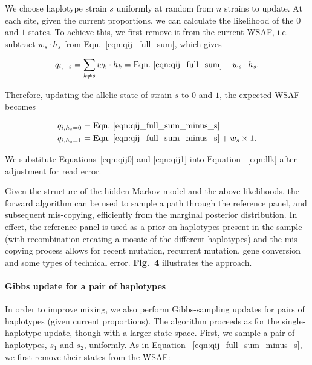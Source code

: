 \documentclass{nature}
\begin{document}
We choose haplotype strain $s$ uniformly at random from $n$ strains to update.  At each site, given the current proportions, we can calculate the likelihood of the $0$ and $1$ states.  To achieve this, we first remove it from the current WSAF, i.e. subtract $ w_s \cdot h_s$ from Eqn.~\eqref{eqn:qij_full_sum}, which gives

\begin{equation}
q_{i,-s} = \sum_{k\neq s} w_k \cdot h_k = \textrm{Eqn.~\eqref{eqn:qij_full_sum}} -  w_s \cdot h_s. \label{eqn:qij_full_sum_minus_s}
\end{equation}

\noindent Therefore, updating the allelic state of strain $s$ to $0$ and $1$, the expected WSAF becomes

\begin{align}
q_{i,h_s=0} & = \textrm{Eqn.~\eqref{eqn:qij_full_sum_minus_s}} \label{eqn:qij0}\\
q_{i,h_s=1} & = \textrm{Eqn.~\eqref{eqn:qij_full_sum_minus_s}} + w_s \times 1. \label{eqn:qij1}
\end{align}

\noindent We substitute Equations~\eqref{eqn:qij0} and \eqref{eqn:qij1} into Equation ~\eqref{eqn:llk} after adjustment for read error.

Given the structure of the hidden Markov model and the above likelihoods, the forward algorithm can be used to sample a path through the reference panel, and subsequent mis-copying, efficiently from the marginal posterior distribution.  In effect, the reference panel is used as a prior on haplotypes present in the sample (with recombination creating a mosaic of the different haplotypes) and the mis-copying process allows for recent mutation, recurrent mutation, gene conversion and some types of technical error. {\bf Fig.~4} illustrates the approach.



\paragraph{Gibbs update for a pair of haplotypes}

In order to improve mixing, we also perform Gibbs-sampling updates for pairs of haplotypes (given current proportions). The algorithm proceeds as for the single-haplotype update, though with a larger state space.  First, we sample a pair of haplotypes, $s_1$ and $s_2$, uniformly. As in Equation ~\eqref{eqn:qij_full_sum_minus_s}, we first remove their states from the WSAF:
\end{document}

